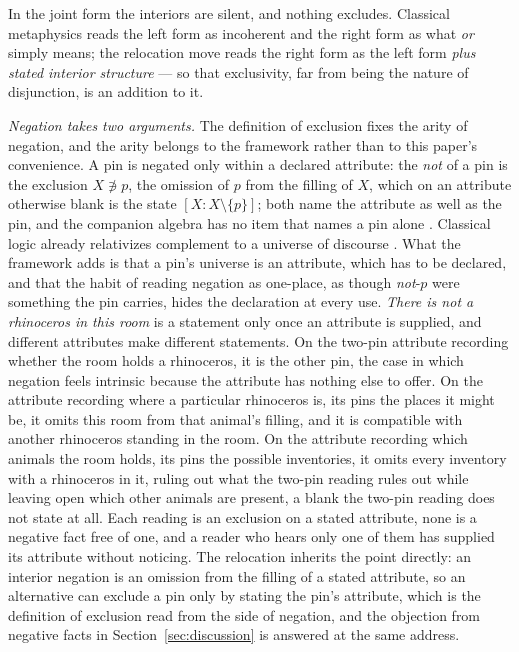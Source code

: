 \documentclass[11pt]{article}
\begin{document}
In the joint form the interiors are silent, and nothing excludes. Classical metaphysics reads the left form as incoherent and the right form as what \emph{or} simply means; the relocation move reads the right form as the left form \emph{plus stated interior structure} --- so that exclusivity, far from being the nature of disjunction, is an addition to it.

\emph{Negation takes two arguments.} The definition of exclusion fixes
the arity of negation, and the arity belongs to the framework rather
than to this paper's convenience. A pin is negated only within a
declared attribute: the \emph{not} of a pin is the exclusion
$X \not\ni p$, the omission of $p$ from the filling of $X$, which on an
attribute otherwise blank is the state $[X : X \setminus \{p\}]$; both
name the attribute as well as the pin, and the companion algebra has
no item that names a pin alone \parencite{AethusTree, Aethus}.
Classical logic already relativizes complement to a universe of
discourse \parencite{boole1854}. What the framework adds is that a
pin's universe is an attribute, which has to be declared, and that the
habit of reading negation as one-place, as though \emph{not}-$p$ were
something the pin carries, hides the declaration at every use.
\emph{There is not a rhinoceros in this room} is a statement only once
an attribute is supplied, and different attributes make different
statements. On the two-pin attribute recording whether the room holds
a rhinoceros, it is the other pin, the case in which negation feels
intrinsic because the attribute has nothing else to offer. On the
attribute recording where a particular rhinoceros is, its pins the
places it might be, it omits this room from that animal's filling, and
it is compatible with another rhinoceros standing in the room. On the
attribute recording which animals the room holds, its pins the
possible inventories, it omits every inventory with a rhinoceros in
it, ruling out what the two-pin reading rules out while leaving open
which other animals are present, a blank the two-pin reading does not
state at all. Each reading is an exclusion on a stated attribute, none
is a negative fact free of one, and a reader who hears only one of
them has supplied its attribute without noticing. The relocation
inherits the point directly: an interior negation is an omission from
the filling of a stated attribute, so an alternative can exclude a pin
only by stating the pin's attribute, which is the definition of
exclusion read from the side of negation, and the objection from
negative facts in Section~\ref{sec:discussion} is answered at the same
address.
\end{document}
